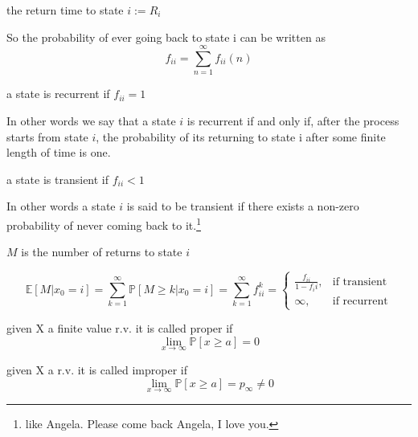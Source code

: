\begin{definition}
the return time to state $i := R_i$
\end{definition}

So the probability of ever going back to state i can be written as
$$f_{ii} = \sum_{n=1}^\infty f_{ii}(n) $$

\begin{definition}
a state is recurrent if $f_{ii} = 1$
\end{definition}
	In other words we say that a state $i$ is recurrent if and only if, after the process starts from state $i$, the probability of its returning to state i after some finite length of time is one.
	
\begin{definition}
	a state is transient if  $f_{ii} < 1$
\end{definition}
	In other words a state $i$ is said to be transient if there exists a non-zero probability of never coming back to it.\footnote{like Angela. Please come back Angela, I love you.}

\begin{definition}
$M$ is the number of returns to state $i$
\end{definition}

$$\mathbb{E}[M | x_0 = i] = \sum_{k=1}^\infty \mathbb{P}[M\geq k | x_0 = i] = \sum_{k=1}^\infty f_{ii}^k = \begin{cases}
\frac{f_{ii}}{1-f_ii}, & \mbox{if transient} \\
\infty, & \mbox{if recurrent}
\end{cases}$$

\begin{definition}[Proper r.v]
given X a finite value r.v. it is called proper if $$\lim_{x\to \infty} \mathbb{P}[x\geq a] = 0$$
\end{definition}

\begin{definition}[Improper r.v]
given X a r.v. it is called improper if  $$\lim_{x\to \infty} \mathbb{P}[x\geq a] = p_\infty \ne 0$$
\end{definition}


